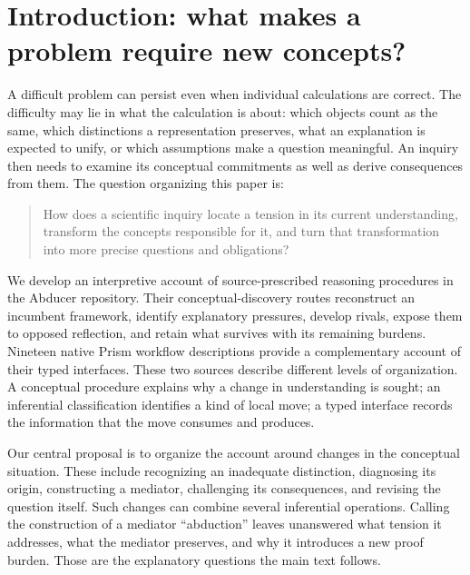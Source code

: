 %
%
%
\section{Introduction: what makes a problem require new concepts?}
\label{sec:conceptual-introduction}
A difficult problem can persist even when individual calculations are correct.
The difficulty may lie in what the calculation is about: which objects count as
the same, which distinctions a representation preserves, what an explanation is
expected to unify, or which assumptions make a question meaningful. An inquiry
then needs to examine its conceptual commitments as well as derive consequences
from them. The question organizing this paper is:
\begin{quote}
How does a scientific inquiry locate a tension in its current understanding,
transform the concepts responsible for it, and turn that transformation into
more precise questions and obligations?
\end{quote}

We develop an interpretive account of source-prescribed reasoning procedures in
the Abducer repository. Their conceptual-discovery routes reconstruct an incumbent
framework, identify explanatory pressures, develop rivals, expose them to opposed
reflection, and retain what survives with its remaining burdens. Nineteen native
Prism workflow descriptions provide a complementary account of their typed
interfaces. These two sources describe different levels of organization. A
conceptual procedure explains why a change in understanding is sought; an
inferential classification identifies a kind of local move; a typed interface
records the information that the move consumes and produces.

Our central proposal is to organize the account around changes in the conceptual
situation. These include recognizing an inadequate distinction, diagnosing its
origin, constructing a mediator, challenging its consequences, and revising the
question itself. Such changes can combine several inferential operations. Calling
the construction of a mediator ``abduction'' leaves unanswered what tension it
addresses, what the mediator preserves, and why it introduces a new proof burden.
Those are the explanatory questions the main text follows.

